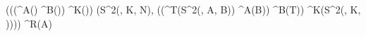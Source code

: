 (((^{A}() \cdot {}^{B}()) \cdot {}^{K}()) \cdot {}(S^{2}(, K\Rightarrow, N\Rightarrow), ((^{T}(S^{2}(, A\Rightarrow, B\Rightarrow)) \cdot {}^{A}(B\Rightarrow)) \cdot {}^{B}(T\Rightarrow)) \cdot {}^{K}(S^{2}(, K\Rightarrow, )))) \cdot {}^{R}(A\Rightarrow)
